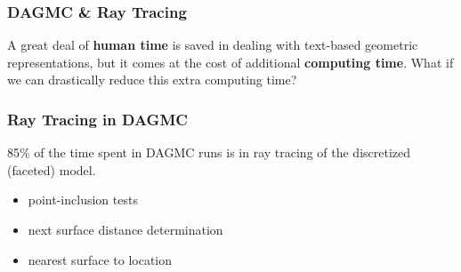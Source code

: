 \documentclass[12pt]{beamer}
\begin{document}

  









\begin{frame}

  \frametitle{DAGMC \& Ray Tracing}
  
  A great deal of \textbf{human time} is saved in dealing with text-based geometric representations, but it comes at the cost of additional \textbf{computing time}.
 \vfill
 What if we can drastically reduce this extra computing time?

 \vfill

  
\end{frame}

\begin{frame}

\frametitle{Ray Tracing in DAGMC}
 85\% of the time spent in DAGMC runs is in ray tracing of the discretized (faceted) model.

\begin{itemize}
\item point-inclusion tests
\item next surface distance determination
\item nearest surface to location
\end{itemize}



\end{frame}
\end{document}
